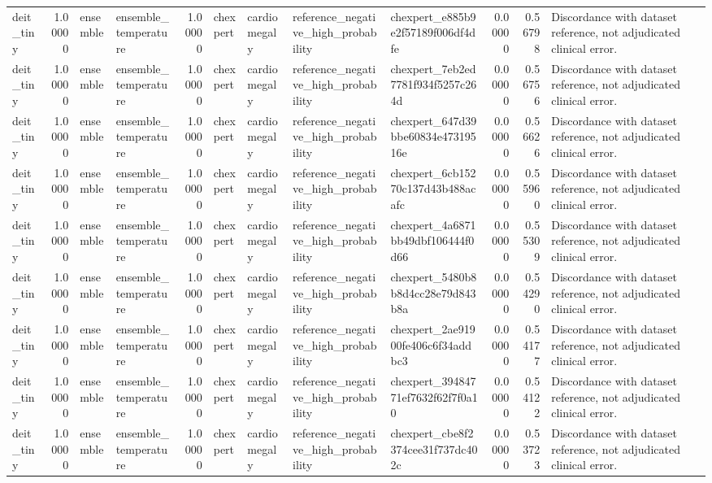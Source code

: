 \begin{tabular}{lrllrllllrrl}
deit\_tiny & 1.00000 & ensemble & ensemble\_temperature & 1.00000 & chexpert & cardiomegaly & reference\_negative\_high\_probability & chexpert\_e885b9e2f57189f006df4dfe & 0.00000 & 0.56798 & Discordance with dataset reference, not adjudicated clinical error. \\
deit\_tiny & 1.00000 & ensemble & ensemble\_temperature & 1.00000 & chexpert & cardiomegaly & reference\_negative\_high\_probability & chexpert\_7eb2ed7781f934f5257c264d & 0.00000 & 0.56756 & Discordance with dataset reference, not adjudicated clinical error. \\
deit\_tiny & 1.00000 & ensemble & ensemble\_temperature & 1.00000 & chexpert & cardiomegaly & reference\_negative\_high\_probability & chexpert\_647d39bbe60834e47319516e & 0.00000 & 0.56626 & Discordance with dataset reference, not adjudicated clinical error. \\
deit\_tiny & 1.00000 & ensemble & ensemble\_temperature & 1.00000 & chexpert & cardiomegaly & reference\_negative\_high\_probability & chexpert\_6cb15270c137d43b488acafc & 0.00000 & 0.55960 & Discordance with dataset reference, not adjudicated clinical error. \\
deit\_tiny & 1.00000 & ensemble & ensemble\_temperature & 1.00000 & chexpert & cardiomegaly & reference\_negative\_high\_probability & chexpert\_4a6871bb49dbf106444f0d66 & 0.00000 & 0.55309 & Discordance with dataset reference, not adjudicated clinical error. \\
deit\_tiny & 1.00000 & ensemble & ensemble\_temperature & 1.00000 & chexpert & cardiomegaly & reference\_negative\_high\_probability & chexpert\_5480b8b8d4cc28e79d843b8a & 0.00000 & 0.54290 & Discordance with dataset reference, not adjudicated clinical error. \\
deit\_tiny & 1.00000 & ensemble & ensemble\_temperature & 1.00000 & chexpert & cardiomegaly & reference\_negative\_high\_probability & chexpert\_2ae91900fe406c6f34addbc3 & 0.00000 & 0.54177 & Discordance with dataset reference, not adjudicated clinical error. \\
deit\_tiny & 1.00000 & ensemble & ensemble\_temperature & 1.00000 & chexpert & cardiomegaly & reference\_negative\_high\_probability & chexpert\_39484771ef7632f62f7f0a10 & 0.00000 & 0.54122 & Discordance with dataset reference, not adjudicated clinical error. \\
deit\_tiny & 1.00000 & ensemble & ensemble\_temperature & 1.00000 & chexpert & cardiomegaly & reference\_negative\_high\_probability & chexpert\_cbe8f2374cee31f737dc402c & 0.00000 & 0.53723 & Discordance with dataset reference, not adjudicated clinical error. \\

\end{tabular}

